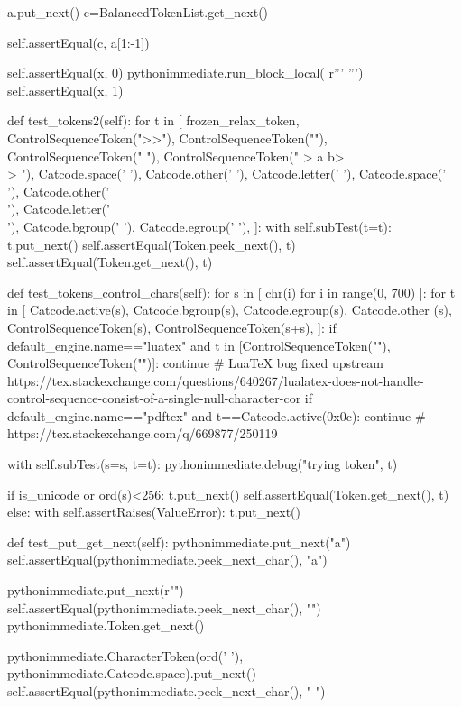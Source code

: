 \documentclass[a5paper]{article}
\begin{document}
\begin{pycode}
			a.put_next()
			c=BalancedTokenList.get_next()

			self.assertEqual(c, a[1:-1])


		self.assertEqual(x, 0)
		pythonimmediate.run_block_local(
		r'''
		''')
		self.assertEqual(x, 1)

	def test_tokens2(self):
		for t in [
				frozen_relax_token,
				ControlSequenceToken(">>"),
				ControlSequenceToken(""),
				ControlSequenceToken("  "),
				ControlSequenceToken(" > a b>\\> "),
				Catcode.space(' '),
				Catcode.other(' '),
				Catcode.letter(' '),
				Catcode.space('\\'),
				Catcode.other('\\'),
				Catcode.letter('\\'),
				Catcode.bgroup(' '),
				Catcode.egroup(' '),
				]:
			with self.subTest(t=t):
				t.put_next()
				self.assertEqual(Token.peek_next(), t)
				self.assertEqual(Token.get_next(), t)

	def test_tokens_control_chars(self):
		for s in [
				chr(i)
				for i in range(0, 700)
				]:
			for t in [
				Catcode.active(s),
				Catcode.bgroup(s),
				Catcode.egroup(s),
				Catcode.other (s),
				ControlSequenceToken(s),
				ControlSequenceToken(s+s),
				]:
				if default_engine.name=="luatex" and t in [ControlSequenceToken(""), ControlSequenceToken("")]:
					continue  # LuaTeX bug fixed upstream https://tex.stackexchange.com/questions/640267/lualatex-does-not-handle-control-sequence-consist-of-a-single-null-character-cor
				if default_engine.name=="pdftex" and t==Catcode.active(0x0c):
					continue  # https://tex.stackexchange.com/q/669877/250119

				with self.subTest(s=s, t=t):
					pythonimmediate.debug("trying token", t)

					if is_unicode or ord(s)<256:
						t.put_next()
						self.assertEqual(Token.get_next(), t)
					else:
						with self.assertRaises(ValueError):
							t.put_next()


	def test_put_get_next(self):
		pythonimmediate.put_next("a")
		self.assertEqual(pythonimmediate.peek_next_char(), "a")

		pythonimmediate.put_next(r"\a")
		self.assertEqual(pythonimmediate.peek_next_char(), "")
		pythonimmediate.Token.get_next()

		pythonimmediate.CharacterToken(ord(' '), pythonimmediate.Catcode.space).put_next()
		self.assertEqual(pythonimmediate.peek_next_char(), " ")


\end{pycode}
\end{document}
